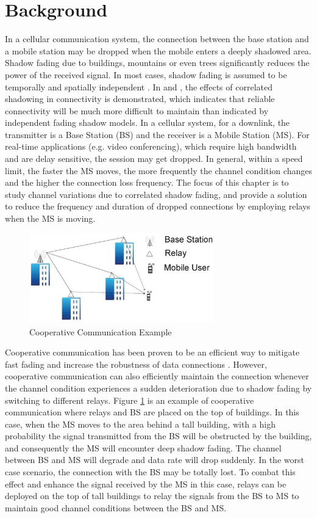\section{Background}
In a cellular communication system, the connection between the base station and a mobile station may be dropped when the mobile  enters a deeply shadowed area. Shadow fading due to buildings, mountains or even trees significantly reduces the power of the received signal. In most cases, shadow fading is assumed to be temporally and spatially independent \cite{rappaport1996wireless}. In \cite{fabbri2009impact} and \cite{patwari2008effects}, the effects of correlated shadowing in connectivity is demonstrated, which indicates that reliable connectivity will be much more difficult to maintain than indicated by independent fading shadow models. In a cellular system, for a downlink, the transmitter is a Base Station (BS) and the receiver is a Mobile Station (MS). For real-time applications (e.g. video conferencing), which require high bandwidth and are delay sensitive, the session may get dropped. In general, within a speed limit, the faster the MS moves, the more frequently the channel condition changes and the higher the connection loss frequency. The focus of this chapter is to study channel variations due to correlated shadow fading, and provide a solution to reduce the frequency and duration of dropped connections by employing relays when the MS is moving.
\begin{figure}
\centering
\includegraphics[width=8cm]{buildingversion2.eps}
\caption{Cooperative Communication Example}
\label{building}
\end{figure}
\par Cooperative communication has been proven to be an efficient way to mitigate fast fading and increase the robustness of data connections \cite{chang2009performance,lee2009performance}. However, cooperative communication can also efficiently maintain the connection whenever the channel condition experiences a sudden deterioration due to shadow fading by switching to different relays. Figure \ref{building} is an example of cooperative communication where relays and BS are placed on the top of buildings. In this case, when the MS moves to the area behind a tall building, with a high probability the signal transmitted from the BS will be obstructed by the building, and consequently the MS will encounter deep shadow fading. The channel  between BS and MS will degrade and data rate will drop suddenly. In the worst case scenario, the connection with the BS may be totally lost. To combat this effect and enhance the signal received by the MS in this case, relays can be deployed on the top of tall buildings to relay the signals from the BS to MS to maintain good channel conditions between the BS and MS.

